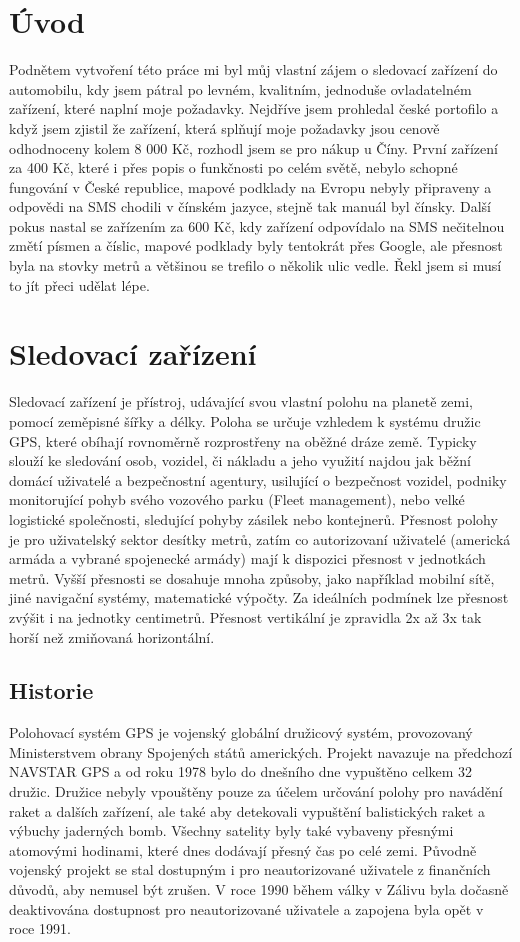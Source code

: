 \documentclass[FM,BP]{tulthesis}  %
\begin{document}

\chapter{Úvod}
Podnětem vytvoření této práce mi byl můj vlastní zájem o sledovací zařízení do automobilu, kdy jsem pátral po levném, kvalitním, jednoduše ovladatelném zařízení, které naplní moje požadavky. Nejdříve jsem prohledal české portofilo a když jsem zjistil že zařízení, která splňují moje požadavky jsou cenově odhodnoceny kolem 8 000 Kč, rozhodl jsem se pro nákup u Číny. První zařízení za 400 Kč, které i přes popis o funkčnosti po celém světě, nebylo schopné fungování v České republice, mapové podklady na Evropu nebyly připraveny a odpovědi na SMS chodili v čínském jazyce, stejně tak manuál byl čínsky. Další pokus nastal se zařízením za 600 Kč, kdy zařízení odpovídalo na SMS nečitelnou změtí písmen a číslic, mapové podklady byly tentokrát přes Google, ale přesnost byla na stovky metrů a většinou se trefilo o několik ulic vedle. Řekl jsem si musí to jít přeci udělat lépe.


\chapter{Sledovací zařízení}
Sledovací zařízení je přístroj, udávající svou vlastní polohu na planetě zemi, pomocí zeměpisné šířky a délky. Poloha se určuje vzhledem k systému družic GPS, které obíhají rovnoměrně rozprostřeny na oběžné dráze země. Typicky slouží ke sledování osob, vozidel, či nákladu a jeho využití najdou jak běžní domácí uživatelé a bezpečnostní agentury, usilující o bezpečnost vozidel, podniky monitorující pohyb svého vozového parku (Fleet management), nebo velké logistické společnosti, sledující pohyby zásilek nebo kontejnerů. Přesnost polohy je pro uživatelský sektor desítky metrů, zatím co autorizovaní uživatelé (americká armáda a vybrané spojenecké armády) mají k dispozici přesnost v jednotkách metrů. Vyšší přesnosti se dosahuje mnoha způsoby, jako například mobilní sítě, jiné navigační systémy, matematické výpočty. Za ideálních podmínek lze přesnost zvýšit i na jednotky centimetrů. Přesnost vertikální je zpravidla 2x až 3x tak horší než zmiňovaná horizontální.

\section{Historie}
Polohovací systém GPS je vojenský globální družicový systém, provozovaný Ministerstvem obrany Spojených států amerických. Projekt navazuje na předchozí NAVSTAR GPS a od roku 1978 bylo do dnešního dne vypuštěno celkem 32 družic. Družice nebyly vpouštěny pouze za účelem určování polohy pro navádění raket a dalších zařízení, ale také aby detekovali vypuštění balistických raket a výbuchy jaderných bomb. Všechny satelity byly také vybaveny přesnými atomovými hodinami, které dnes dodávají přesný čas po celé zemi. Původně vojenský projekt se stal dostupným i pro neautorizované uživatele z finančních důvodů, aby nemusel být zrušen. V roce 1990 během války v Zálivu byla dočasně deaktivována dostupnost pro neautorizované uživatele a zapojena byla opět v roce 1991.
\end{document}
